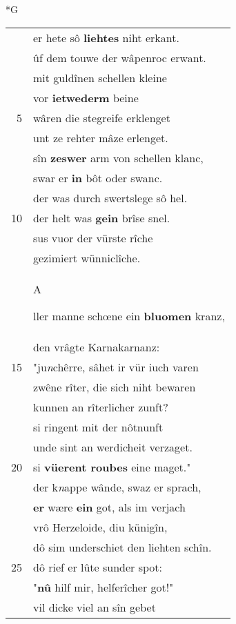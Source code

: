 \documentclass[8pt,a4paper,notitlepage]{article}
\begin{document}
\newpage
\begin{table}[ht]
\begin{minipage}[t]{0.5\linewidth}
\small
\begin{center}*G
\end{center}
\begin{tabular}{rl}
 & er hete sô \textbf{liehtes} niht erkant.\\ 
 & ûf dem touwe der wâpenroc erwant.\\ 
 & mit guldînen schellen kleine\\ 
 & vor \textbf{ietwederm} beine\\ 
5 & wâren die stegreife erklenget\\ 
 & unt ze rehter mâze erlenget.\\ 
 & sîn \textbf{zeswer} arm von schellen klanc,\\ 
 & swar er \textbf{in} bôt oder swanc.\\ 
 & der was durch swertslege sô hel.\\ 
10 & der helt was \textbf{gein} brîse snel.\\ 
 & sus vuor der vürste rîche\\ 
 & gezimiert wünniclîche.\\ 
 & \begin{large}A\end{large}ller manne schœne ein \textbf{bluomen} kranz,\\ 
 & den vrâgte Karnakarnanz:\\ 
15 & "ju\textit{n}chêrre, sâhet ir vür iuch varen\\ 
 & zwêne rîter, die sich niht bewaren\\ 
 & kunnen an rîterlicher zunft?\\ 
 & si ringent mit der nôtnunft\\ 
 & unde sint an werdicheit verzaget.\\ 
20 & si \textbf{vüerent roubes} eine maget."\\ 
 & der k\textit{n}appe wânde, swaz er sprach,\\ 
 & \textbf{er} wære \textbf{ein} got, als im verjach\\ 
 & vrô Herzeloide, diu künigîn,\\ 
 & dô sim underschiet den liehten schîn.\\ 
25 & dô rief er lûte sunder spot:\\ 
 & "\textbf{nû} hilf mir, helferîcher got!"\\ 
 & vil dicke viel an sîn gebet\\ 

\end{tabular}
\end{minipage}
\end{table}
\end{document}
